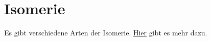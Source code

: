 \section{Isomerie}
Es gibt verschiedene Arten der Isomerie. 
\hyperref[sec:isomere]{Hier} gibt es mehr dazu.

